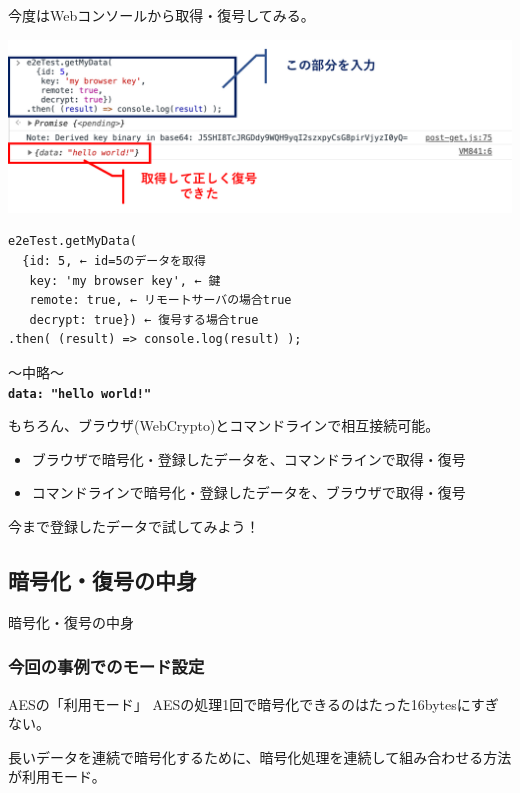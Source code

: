 \documentclass[12pt,dvipdfmx]{beamer}
\begin{document}
\begin{frame}[fragile]
今度はWebコンソールから取得・復号してみる。
\begin{center}
\includegraphics[width=0.9\linewidth]{Figs/browser-img3.pdf}
\end{center}
\begin{exampleblock}{}\footnotesize
\begin{verbatim}
e2eTest.getMyData(
  {id: 5, ← id=5のデータを取得
   key: 'my browser key', ← 鍵
   remote: true, ← リモートサーバの場合true
   decrypt: true}) ← 復号する場合true
.then( (result) => console.log(result) );
\end{verbatim}
〜中略〜\\[1ex]
\textbf{\texttt{{data: "hello world!"}}}
\end{exampleblock}
\end{frame}

\begin{frame}
もちろん、ブラウザ(WebCrypto)とコマンドラインで相互接続可能。
\begin{itemize}
 \item ブラウザで暗号化・登録したデータを、コマンドラインで取得・復号
 \item コマンドラインで暗号化・登録したデータを、ブラウザで取得・復号
\end{itemize}
\begin{center}
今まで登録したデータで試してみよう！ 
\end{center}
\end{frame}

\subsection{暗号化・復号の中身}
\begin{frame}
\centering
{\Large 暗号化・復号の中身}
\end{frame}

\begin{frame}
\frametitle{今回の事例でのモード設定}

\begin{block}{\small AESの「利用モード」}
AESの処理1回で暗号化できるのはたった16bytesにすぎない。

長いデータを連続で暗号化するために、\alert{暗号化処理を連続して組み合わせる方法}が利用モード。
\end{block}
\end{frame}
\end{document}
